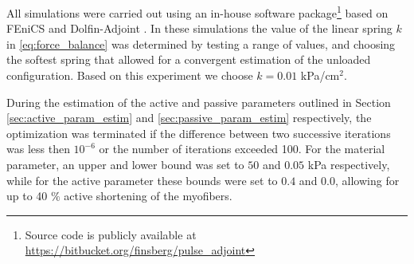 All simulations were carried out using an in-house software
package\footnote{Source code is publicly available at
  \url{https://bitbucket.org/finsberg/pulse_adjoint}} 
based on FEniCS \cite{logg2012automated} and Dolfin-Adjoint \cite{farrell2013automated}.
In these simulations the value of the linear spring $k$ in
\eqref{eq:force_balance} was determined by testing a range of values,
and choosing the softest spring that allowed for a convergent
estimation of the unloaded configuration. Based on this experiment we
choose $k=0.01$ kPa/cm$^2$.

During the estimation of the active and passive parameters outlined in Section
\ref{sec:active_param_estim} and \ref{sec:passive_param_estim}
respectively, the optimization was terminated if the difference between two
successive iterations was less then $10^{-6}$ or the number of
iterations exceeded 100. For the material parameter, an upper and lower
bound was set to $50$ and $0.05$ kPa respectively, while for the active
parameter these bounds were set to $0.4$ and $0.0$, allowing for up to
40 $\%$ active shortening of the myofibers. 




